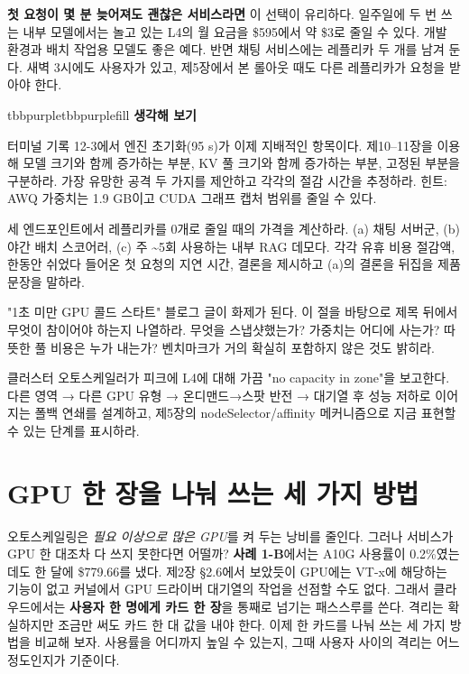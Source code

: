 \textbf{첫 요청이 몇 분 늦어져도 괜찮은 서비스라면} 이 선택이 유리하다. 일주일에 두 번 쓰는 내부 모델에서는 놀고 있는 L4의 월 요금을 \$595에서 약 \$3로 줄일 수 있다. 개발 환경과 배치 작업용 모델도 좋은 예다. 반면 채팅 서비스에는 레플리카 두 개를 남겨 둔다. 새벽 3시에도 사용자가 있고, 제5장에서 본 롤아웃 때도 다른 레플리카가 요청을 받아야 한다.

\begin{calloutbox}{tbbpurple}{tbbpurplefill}
{\normalsize\bfseries\color{tbbpurple}생각해 보기}\par\vspace{3pt}
\begin{tbbitemize}
  \item 터미널 기록 12-3에서 엔진 초기화(95 s)가 이제 지배적인 항목이다. 제10–11장을 이용해 모델 크기와 함께 증가하는 부분, KV 풀 크기와 함께 증가하는 부분, 고정된 부분을 구분하라. 가장 유망한 공격 두 가지를 제안하고 각각의 절감 시간을 추정하라. 힌트: AWQ 가중치는 1.9 GB이고 CUDA 그래프 캡처 범위를 줄일 수 있다.
  \item 세 엔드포인트에서 레플리카를 0개로 줄일 때의 가격을 계산하라. (a) 채팅 서버군, (b) 야간 배치 스코어러, (c) 주 \textasciitilde{}5회 사용하는 내부 RAG 데모다. 각각 유휴 비용 절감액, 한동안 쉬었다 들어온 첫 요청의 지연 시간, 결론을 제시하고 (a)의 결론을 뒤집을 제품 문장을 말하라.
  \item "1초 미만 GPU 콜드 스타트" 블로그 글이 화제가 된다. 이 절을 바탕으로 제목 뒤에서 무엇이 참이어야 하는지 나열하라. 무엇을 스냅샷했는가? 가중치는 어디에 사는가? 따뜻한 풀 비용은 누가 내는가? 벤치마크가 거의 확실히 포함하지 않은 것도 밝히라.
  \item 클러스터 오토스케일러가 피크에 L4에 대해 가끔 "no capacity in zone"을 보고한다. 다른 영역 → 다른 GPU 유형 → 온디맨드→스팟 반전 → 대기열 후 성능 저하로 이어지는 폴백 연쇄를 설계하고, 제5장의 nodeSelector/affinity 메커니즘으로 지금 표현할 수 있는 단계를 표시하라.
\end{tbbitemize}
\end{calloutbox}

\section{GPU 한 장을 나눠 쓰는 세 가지 방법}

오토스케일링은 \textit{필요 이상으로 많은 GPU}를 켜 두는 낭비를 줄인다. 그러나 서비스가 GPU 한 대조차 다 쓰지 못한다면 어떨까? \textbf{사례 1-B}에서는 A10G 사용률이 0.2\%였는데도 한 달에 \$779.66를 냈다. 제2장 §2.6에서 보았듯이 GPU에는 VT-x에 해당하는 기능이 없고 커널에서 GPU 드라이버 대기열의 작업을 선점할 수도 없다. 그래서 클라우드에서는 \textbf{사용자 한 명에게 카드 한 장}을 통째로 넘기는 패스스루를 쓴다. 격리는 확실하지만 조금만 써도 카드 한 대 값을 내야 한다. 이제 한 카드를 나눠 쓰는 세 가지 방법을 비교해 보자. 사용률을 어디까지 높일 수 있는지, 그때 사용자 사이의 격리는 어느 정도인지가 기준이다.

